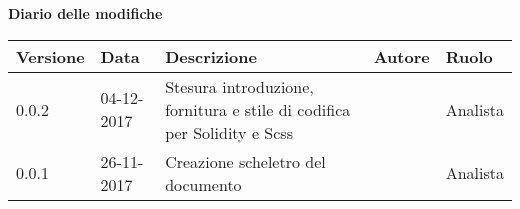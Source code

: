 \documentclass[NormeDiProgetto.tex]{subfiles}
\begin{document}
	
	\huge \bfseries Diario delle modifiche\\
	\begin{table}[htbp]
		\centering
		\renewcommand\arraystretch{1.2}
		
		\begin{tabularx}{\textwidth}{p{2cm}|p{2cm}|p{4cm}|p{2cm}|p{2cm}}
			\hline
			\textbf{Versione} & \textbf{Data} & \textbf{Descrizione} & \textbf{Autore} & \textbf{Ruolo}\\
			\hline
			0.0.2 & 04-12-2017 & Stesura introduzione, fornitura e stile di codifica per Solidity e Scss & \Elena & Analista \\
			\hline
			0.0.1 & 26-11-2017 & Creazione scheletro del documento & \Elena & Analista \\
			\hline
			
		\end{tabularx}
		
	\end{table}
\restoregeometry
\end{document}
